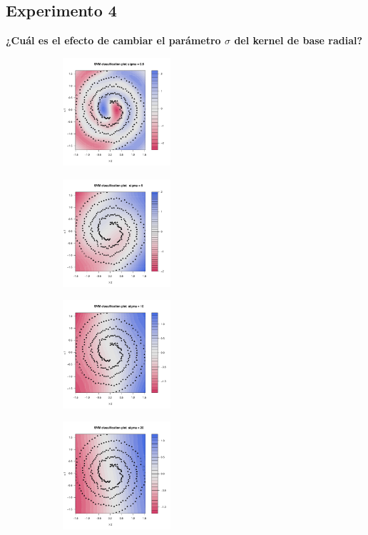 \subsection*{Experimento 4}

\textbf{¿Cuál es el efecto de cambiar el parámetro $\sigma$ del kernel de base radial?}

\begin{figure}[H]
	\centering
	\begin{subfigure}{4cm}
		\includegraphics[width=4cm]{Graphics/Problema_01/Experiment_04_1.pdf}
		\caption{}
	\end{subfigure}
	\begin{subfigure}{4cm}
		\includegraphics[width=4cm]{Graphics/Problema_01/Experiment_04_2.pdf}
		\caption{}
	\end{subfigure}
	\begin{subfigure}{4cm}
		\includegraphics[width=4cm]{Graphics/Problema_01/Experiment_04_3.pdf}
		\caption{}
	\end{subfigure}
	\begin{subfigure}{4cm}
		\includegraphics[width=4cm]{Graphics/Problema_01/Experiment_04_4.pdf}
		\caption{}
	\end{subfigure}
	\caption{}
\end{figure}